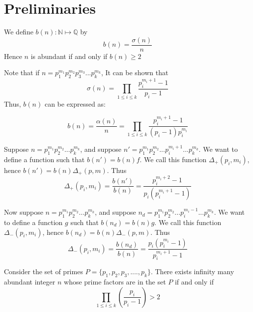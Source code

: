 \documentclass[../paper.tex]{article}
\begin{document}
\section{Preliminaries}

We define $b(n): \mathbb{N} \mapsto \mathbb{Q}$ by
%
$$b(n) = \frac{\sigma(n)}{n} $$
%
Hence $n$ is abundant if and only if $b(n) \geq 2$

Note that if $n=p_1^{m_1}p_2^{m_2}p_3^{m_3}...p_{k}^{m_k}$,
It can be shown that 
%
$$\sigma(n) = \prod_{1 \leq i \leq k} \frac{p_i^{m_i + 1} -1}{p_i -1}$$
%
Thus, $b(n)$ can be expressed as:

$$b(n) = \frac{\alpha(n)}{n} = \prod_{1 \leq i \leq k} 
\frac{p_i^{m_i + 1} -1}{(p_i -1)p_{i}^{m_{i}}}$$

	Suppose $n=p_1^{m_1}p_2^{m_2}...p_{k}^{m_k}$, and suppose 
$n'=p_1^{m_1}p_2^{m_2}...p_i^{m_i + 1}...p_{k}^{m_k}$. We want
to define a function such that $b(n') = b(n) f$. We call this
function $\Delta_{+}(p_i, m_i)$, hence $b(n') = b(n) \Delta_{+}(p,m)$.
Thus 
%
$$\Delta_{+}(p_i, m_i) = \frac{b(n')}{b(n)} = 
\frac{p_i^{m_i+2} - 1}{ p_i (p_i^{m_i + 1} - 1)}$$
%

	Now suppose $n=p_1^{m_1}p_2^{m_2}...p_{k}^{m_k}$, and suppose 
$n_d=p_1^{m_1}p_2^{m_2}...p_i^{m_i - 1}...p_{k}^{m_k}$. We want
to define a function $g$ such that $b(n_d) = b(n) g$. We call this
function $\Delta_{-}(p_i, m_i)$, hence $b(n_d) = b(n) \Delta_{-}(p,m)$.
Thus 
%
$$\Delta_{-}(p_i, m_i) = \frac{b(n_d)}{b(n)} = 
\frac{p_i(p_i^{m_i} - 1)}{ p_i^{m_i + 1} - 1}$$
%

\begin{theorem} Consider the set of primes 
%
$P = \{p_{1}, p_{2}, p_{3}, .... , p_{k}\}$.
%
There exists infinity many abundant integer $n$ whose prime 
factors are in the set $P$  if and only if
%
$$\prod_{1 \leq i \leq k} (\frac{p_{i}}{p_{i} -1}) > 2$$
%
\end{theorem}
\end{document}
